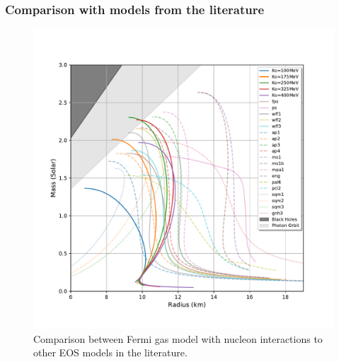 \documentclass[hperref={pdfpagelabels=false}]{beamer}
\begin{document}
\begin{frame}
 \frametitle{Comparison with models from the literature}
 \begin{figure}
    \includegraphics[scale=0.3]{eos_compare_paper.pdf}
    \caption{Comparison between Fermi gas model with nucleon interactions to other EOS models in the literature.}
 \end{figure}
\end{frame}
\end{document}
